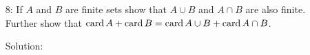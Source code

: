 \begin{enumerate}
\item[8:] If $A$ and $B$ are finite sets show that $A \cup B$ and $A \cap
B$ are also finite. Further show that $\operatorname{card} A + \operatorname{card} B = \operatorname{card} A \cup B
+ \operatorname{card} A \cap B$.
\item[Solution:]
\end{enumerate}
